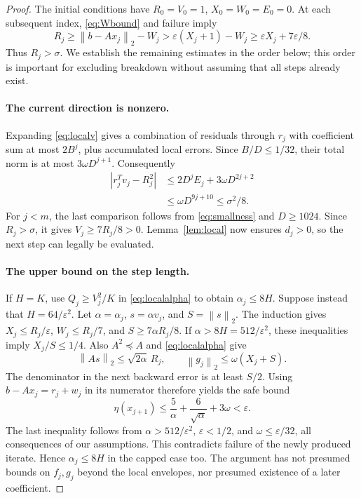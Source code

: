 \documentclass[11pt]{article}
\theoremstyle{remark}\newtheorem{remark}[theorem]{Remark}
\newcommand{\norm}[1]{\left\lVert#1\right\rVert_2}
\newcommand{\eps}{\varepsilon}
\begin{document}
\begin{proof}
The initial conditions have $R_0=V_0=1$, $X_0=W_0=E_0=0$.
At each subsequent index, \eqref{eq:Wbound} and failure imply
\[
R_j\ge\norm{b-Ax_j}-W_j>
\eps(X_j+1)-W_j\ge\eps X_j+7\eps/8.
\]
Thus $R_j>\sigma$. We establish the remaining estimates in the order
below; this order is important for excluding breakdown without assuming
that all steps already exist.

\paragraph{The current direction is nonzero.}
Expanding \eqref{eq:localv} gives a combination of residuals through
$r_j$ with coefficient sum at most $2B^j$, plus accumulated local errors.
Since $B/D\le1/32$, their total norm is at most
$3\omega D^{j+1}$. Consequently
\begin{align*}
|r_j^Tv_j-R_j^2|
&\le2D^jE_j+3\omega D^{2j+2}\\
&\le\omega D^{9j+10}\le\sigma^2/8.
\end{align*}
For $j<m$, the last comparison follows from \eqref{eq:smallness} and
$D\ge1024$. Since $R_j>\sigma$, it gives $V_j\ge7R_j/8>0$.
Lemma~\ref{lem:local} now ensures $d_j>0$, so the next step can legally
be evaluated.

\paragraph{The upper bound on the step length.}
If $H=K$, use $Q_j\ge V_j^2/K$ in \eqref{eq:localalpha} to obtain
$\alpha_j\le8H$.
Suppose instead that $H=64/\eps^2$. Let $\alpha=\alpha_j$,
$s=\alpha v_j$, and $S=\norm s$. The induction gives
$X_j\le R_j/\eps$, $W_j\le R_j/7$, and $S\ge7\alpha R_j/8$.
If $\alpha>8H=512/\eps^2$, these inequalities imply $X_j/S\le1/4$.
Also $A^2\preceq A$ and \eqref{eq:localalpha} give
\[
\norm{As}\le\sqrt{2\alpha}\,R_j,
\qquad \norm{g_j}\le\omega(X_j+S).
\]
The denominator in the next backward error is at least $S/2$.
Using $b-Ax_j=r_j+w_j$ in its numerator therefore yields the safe bound
\begin{equation}\label{eq:largestepsuccess}
\eta(x_{j+1})\le\frac5\alpha+\frac6{\sqrt\alpha}+3\omega<\eps.
\end{equation}
The last inequality follows from $\alpha>512/\eps^2$,
$\eps<1/2$, and $\omega\le\eps/32$, all consequences of our assumptions.
This contradicts failure of the newly produced iterate. Hence
$\alpha_j\le8H$ in the capped case too. The argument has not presumed
bounds on $f_j,g_j$ beyond the local envelopes, nor presumed existence
of a later coefficient.


\end{proof}
\end{document}
